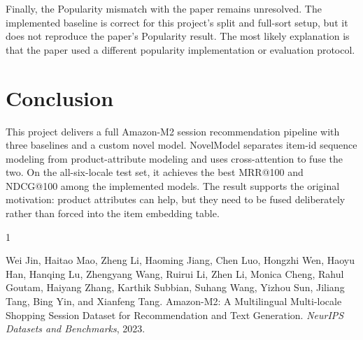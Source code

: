 \documentclass[11pt]{article}
\newcommand{\metric}[1]{\textsc{#1}}
\begin{document}
Finally, the Popularity mismatch with the paper remains unresolved. The implemented baseline is correct for this project's split and full-sort setup, but it does not reproduce the paper's Popularity result. The most likely explanation is that the paper used a different popularity implementation or evaluation protocol.

\section{Conclusion}

This project delivers a full Amazon-M2 session recommendation pipeline with three baselines and a custom novel model. NovelModel separates item-id sequence modeling from product-attribute modeling and uses cross-attention to fuse the two. On the all-six-locale test set, it achieves the best \metric{MRR@100} and \metric{NDCG@100} among the implemented models. The result supports the original motivation: product attributes can help, but they need to be fused deliberately rather than forced into the item embedding table.

\begin{thebibliography}{1}

Wei Jin, Haitao Mao, Zheng Li, Haoming Jiang, Chen Luo, Hongzhi Wen, Haoyu Han, Hanqing Lu, Zhengyang Wang, Ruirui Li, Zhen Li, Monica Cheng, Rahul Goutam, Haiyang Zhang, Karthik Subbian, Suhang Wang, Yizhou Sun, Jiliang Tang, Bing Yin, and Xianfeng Tang.
\newblock Amazon-M2: A Multilingual Multi-locale Shopping Session Dataset for Recommendation and Text Generation.
\newblock \emph{NeurIPS Datasets and Benchmarks}, 2023.

\end{thebibliography}
\end{document}
